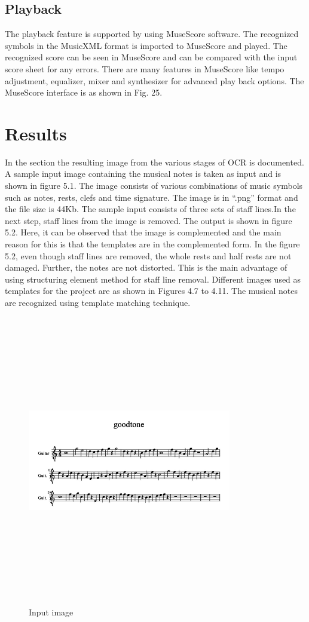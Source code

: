 \documentclass[journal]{IEEEtran}
\begin{document}
\subsection{Playback}
The playback feature is supported by using MuseScore software. The recognized symbols in
the MusicXML format is imported to MuseScore and played. The recognized score can be seen
in MuseScore and can be compared with the input score sheet for any errors. There are many
features in MuseScore like tempo adjustment, equalizer, mixer and synthesizer for advanced play
back options. The MuseScore interface is as shown in Fig. 25.

\section{Results}
In the section the resulting image from the various stages of OCR is documented.  A sample input image containing the musical notes is taken as input and is shown in figure 5.1. The image consists of various combinations of music symbols such as notes, rests, clefs and time signature. The image is in “.png” format and the file size is 44Kb. The sample input consists of three sets of staff lines.In the next step, staff lines from the image is removed. The output is shown in figure 5.2. Here, it can be observed that the image is complemented and the main reason for this is that the templates
are in the complemented form. In the figure 5.2, even though staff lines are removed, the whole rests and half rests are not damaged. Further, the notes are not distorted. This is the main advantage of using structuring element method for staff line removal. Different images used as templates for the project are as shown in Figures 4.7 to 4.11. The musical notes are recognized using template matching technique. \par
\begin{figure}
\includegraphics[width=3.5in,height=5.0in,clip,keepaspectratio]{resources/results/good_tone}
\centering
\caption{Input image}
\end{figure}
\end{document}
